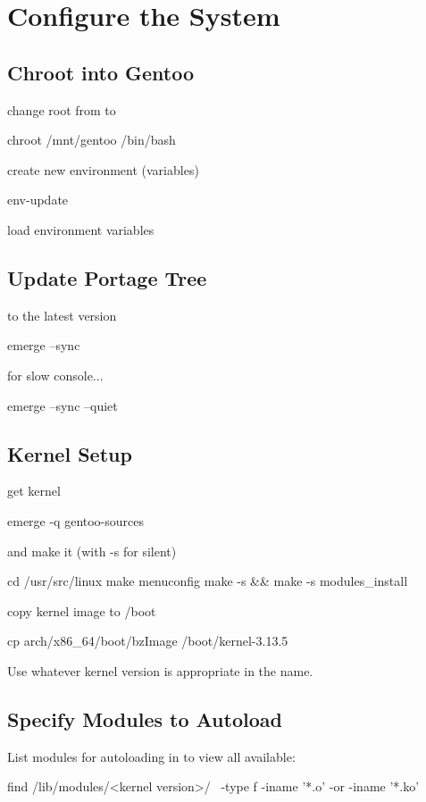 \section{Configure the System}

\subsection{Chroot into Gentoo}
change root from \ilcode{/} to 
\begin{code}
chroot /mnt/gentoo /bin/bash
\end{code}
create new environment (variables)
\begin{code}
env-update
\end{code}
load environment variables

\subsection{Update Portage Tree}
to the latest version
\begin{code}
emerge --sync
\end{code}
for slow console...
\begin{code}
emerge --sync --quiet
\end{code}

\subsection{Kernel Setup}
get kernel
\begin{code}
emerge -q gentoo-sources
\end{code}
and make it (with -s for silent)
\begin{code}
cd /usr/src/linux
make menuconfig
make -s && make -s modules_install
\end{code}
copy kernel image to /boot
\begin{code}
cp arch/x86_64/boot/bzImage /boot/kernel-3.13.5
\end{code}
Use whatever kernel version is appropriate in the name.

\subsection{Specify Modules to Autoload}
List modules for autoloading in 
to view all available:
\begin{code}
find /lib/modules/<kernel version>/ \
  -type f -iname '*.o' -or -iname '*.ko'
\end{code}

